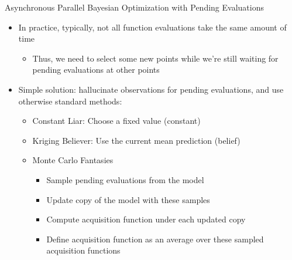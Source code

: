 \begin{frame}[c]{Asynchronous Parallel Bayesian Optimization with Pending Evaluations}

\begin{itemize}
    \item In practice, typically, not all function evaluations take the same amount of time
    \begin{itemize}
        \item Thus, we need to select \alert{some new points} while we're still waiting for \alert{pending evaluations} at other points
    \end{itemize}
\pause
\bigskip
%
    \item Simple solution: \alert{hallucinate observations for pending evaluations}, and use otherwise standard methods:
    \pause
    \begin{itemize}
        \item \alert{Constant Liar}: Choose a fixed value (constant) 
\smallskip
\item \alert{Kriging Believer}: Use the current mean prediction (belief)  
\smallskip
\item \alert{Monte Carlo Fantasies} 
        \pause
        \begin{itemize}
            \item Sample pending evaluations from the model
            \item Update copy of the model with these samples
            \item Compute acquisition function under each updated copy 
            \item Define acquisition function as an average over these sampled acquisition functions
        \end{itemize}
    \end{itemize}
\end{itemize}

\end{frame}
\iffalse
